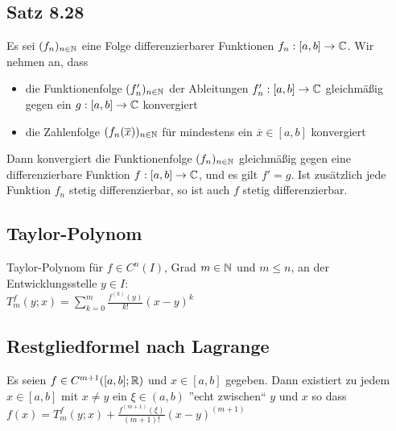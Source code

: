 \documentclass[german]{latex4ei/latex4ei_sheet}
\begin{document}
	


\begin{sectionbox}
	\subsection{Satz 8.28}
	Es sei $(f_n)_{n \in \operatorname{\mathbb N}}$ eine Folge differenzierbarer Funktionen $f_n : [a, b] \rightarrow \mathbb C$. Wir nehmen an, dass 
	\begin{itemize}
		\item die Funktionenfolge $(f'_n)_{n \in \operatorname{\mathbb N}}$ der Ableitungen $f'_n : [a, b] \rightarrow \mathbb C$ gleichmäßig gegen ein $ g : [a, b] \rightarrow \mathbb C$ konvergiert
		\item die Zahlenfolge $(f_n(\overline{x}))_{n \in \operatorname{\mathbb N}}$ für mindestens ein $\overline{x} \in  [a, b]$ konvergiert
	\end{itemize}
	Dann konvergiert die Funktionenfolge $(f_n)_{n \in \operatorname{\mathbb N}}$ gleichmäßig gegen eine differenzierbare Funktion $f : [a,b] \rightarrow \mathbb C$, und es gilt $f' = g$. Ist zusätzlich jede Funktion $f_n$ stetig differenzierbar, so ist auch $f$ stetig differenzierbar.

\end{sectionbox}
 
\begin{sectionbox}
	\subsection{Taylor-Polynom}
	Taylor-Polynom für $f \in C^n(I)$, Grad $m \in \operatorname{\mathbb N}$ und $m \le n$, an der Entwicklungsstelle $y \in I$:\\
	$T_m^f(y;x)= \sum \limits_{k=0}^{m} \frac{f^{(k)}(y)}{k!}(x-y)^k$

\end{sectionbox}

\begin{sectionbox}
	\subsection{Restgliedformel nach Lagrange}
	Es seien $f \in C^{m+1}([a, b]; \operatorname{\mathbb R})$ und $x \in [a, b]$ gegeben. Dann existiert zu jedem $x \in [a,b]$ mit $x \neq y$ ein $\xi \in (a,b)$ ”echt zwischen“ $y$ und $x$ so dass\\
	$f(x)=T_m^f(y;x)+\frac{f^{(m+1)}(\xi)}{(m+1)!}(x-y)^{(m+1)}$

\end{sectionbox}
\end{document}
